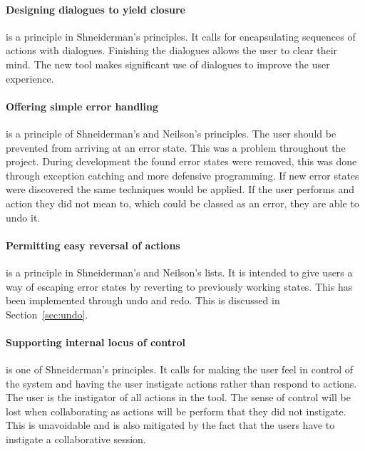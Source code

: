 \paragraph*{Designing dialogues to yield closure} is a principle in Shneiderman's principles.  It calls for encapsulating sequences of actions with dialogues.  Finishing the dialogues allows the user to clear their mind.  The new tool makes significant use of dialogues to improve the user experience.

\paragraph*{Offering simple error handling} is a principle of Shneiderman's and Neilson's principles.  The user should be prevented from arriving at an error state.  This was a problem throughout the project.  During development the found error states were removed, this was done through exception catching and more defensive programming.  If new error states were discovered the same techniques would be applied.  If the user performs and action they did not mean to, which could be classed as an error, they are able to undo it.

\paragraph*{Permitting easy reversal of actions} is a principle in Shneiderman's and Neilson's lists.  It is intended to give users a way of escaping error states by reverting to previously working states.  This has been implemented through undo and redo.  This is discussed in Section~\ref{sec:undo}.

\paragraph*{Supporting internal locus of control} is one of Shneiderman's principles.  It calls for making the user feel in control of the system and having the user instigate actions rather than respond to actions.  The user is the instigator of all actions in the tool.  The sense of control will be lost when collaborating as actions will be perform that they did not instigate.  This is unavoidable and is also mitigated by the fact that the users have to instigate a collaborative session.

